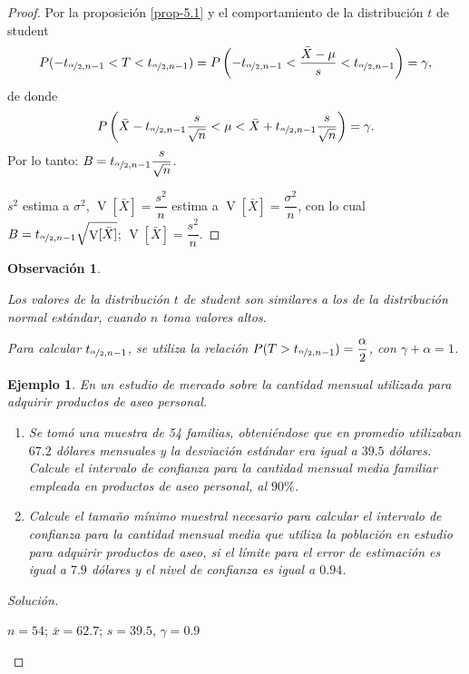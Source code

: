 \documentclass[a5paper,doc,10pt,noapacite]{apa6}
\DeclareMathOperator{\Var}{V}
\newtheorem{observ}{Observación}
\newtheorem{ejem}{Ejemplo}
\begin{document}
{{\begin{proof}
	Por la proposición \eqref{prop-5.1} y el comportamiento de la distribución \(t\) de student 
	\[
		P(-t_{\nicefrac{\alpha}{2},n-1}<T<t_{\nicefrac{\alpha}{2},n-1})= P\left(-t_{\nicefrac{\alpha}{2},n-1}<\dfrac{\bar{X}-\mu}{s}<t_{\nicefrac{\alpha}{2},n-1}\right)=\gamma,
	\]
	de donde  
	\[
		P\left(\bar{X}-t_{\nicefrac{\alpha}{2},n-1}\dfrac{s}{\sqrt{n}}<\mu<\bar{X}+t_{\nicefrac{\alpha}{2},n-1}\dfrac{s}{\sqrt{n}}\right)=\gamma. 
	\]	
	Por lo tanto: \(B=t_{\nicefrac{\alpha}{2},n-1}\dfrac{s}{\sqrt{n}}\).
	
	\(s^2\) estima a \(\sigma^2\), \(\Var[\bar{X}]=\dfrac{s^2}{n}\) estima a \(\Var[\bar{X}]=\dfrac{\sigma^2}{n}\), con lo cual \(B=t_{\nicefrac{\alpha}{2},n-1}\sqrt{\Var[\bar{X}]}\); \(\Var[\bar{X}]=\dfrac{s^2}{n}\).
\end{proof}


\begin{observ}\quad
	\begin{APAenumerate}
		\item Los valores de la distribución \(t\) de student son similares a los de la distribución normal estándar, cuando \(n\) toma valores altos.
		\item Para calcular \(t_{\nicefrac{\alpha}{2},n-1}\), se utiliza la relación \(P(T>t_{\nicefrac{\alpha}{2},n-1})=\dfrac{\alpha}{2}\), con \(\gamma+\alpha=1\).
	\end{APAenumerate}
\end{observ}


\begin{ejem}
	En un estudio de mercado sobre la cantidad mensual utilizada para adquirir productos de aseo personal.
	\begin{enumerate}
		\item Se tomó una muestra de 54 familias, obteniéndose que en promedio utilizaban \(67.2\) dólares mensuales y la desviación estándar era igual a \(39.5\) dólares. Calcule el intervalo de confianza para la cantidad mensual media familiar empleada en productos de aseo personal, al \(90\%\).
		\item Calcule el tamaño mínimo muestral necesario para calcular el intervalo de confianza para la cantidad mensual media que utiliza la población en estudio para adquirir productos de aseo, si el límite para el error de estimación es igual a \(7.9\) dólares y el nivel de confianza es igual a \(0.94\).
	\end{enumerate}
\end{ejem}
\begin{proof}[Solución]\quad
	\begin{APAenumerate}
		\item \(n=54\); \(\bar{x}=62.7\); \(s=39.5\), \(\gamma=0.9\)
		

\end{APAenumerate}
\end{proof}}}
\end{document}
